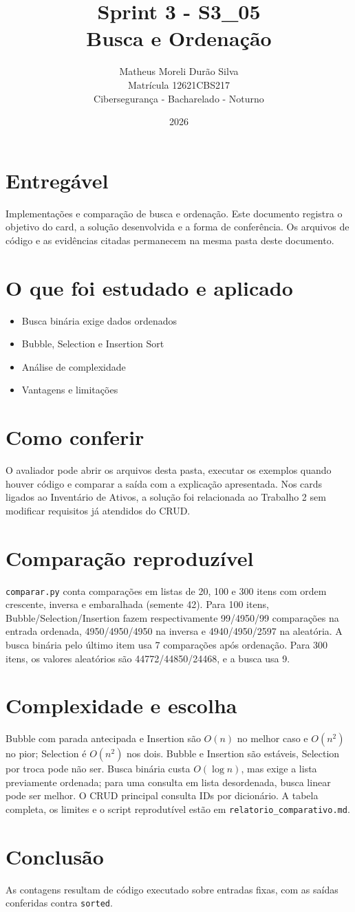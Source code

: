 \documentclass[12pt]{article}
\title{Sprint 3 - S3\_05\\Busca e Ordenação}
\author{Matheus Moreli Durão Silva\\Matrícula 12621CBS217\\Cibersegurança - Bacharelado - Noturno}
\date{2026}
\begin{document}
\maketitle

\section*{Entregável}
Implementações e comparação de busca e ordenação. Este documento registra o objetivo do card, a solução desenvolvida e a forma de conferência. Os arquivos de código e as evidências citadas permanecem na mesma pasta deste documento.

\section*{O que foi estudado e aplicado}
\begin{itemize}
\item Busca binária exige dados ordenados
\item Bubble, Selection e Insertion Sort
\item Análise de complexidade
\item Vantagens e limitações
\end{itemize}

\section*{Como conferir}
O avaliador pode abrir os arquivos desta pasta, executar os exemplos quando houver código e comparar a saída com a explicação apresentada. Nos cards ligados ao Inventário de Ativos, a solução foi relacionada ao Trabalho 2 sem modificar requisitos já atendidos do CRUD.

\section*{Comparação reproduzível}
\texttt{comparar.py} conta comparações em listas de 20, 100 e 300 itens com ordem crescente, inversa e embaralhada (semente 42). Para 100 itens, Bubble/Selection/Insertion fazem respectivamente 99/4950/99 comparações na entrada ordenada, 4950/4950/4950 na inversa e 4940/4950/2597 na aleatória. A busca binária pelo último item usa 7 comparações após ordenação. Para 300 itens, os valores aleatórios são 44772/44850/24468, e a busca usa 9.
\section*{Complexidade e escolha}
Bubble com parada antecipada e Insertion são $O(n)$ no melhor caso e $O(n^2)$ no pior; Selection é $O(n^2)$ nos dois. Bubble e Insertion são estáveis, Selection por troca pode não ser. Busca binária custa $O(\log n)$, mas exige a lista previamente ordenada; para uma consulta em lista desordenada, busca linear pode ser melhor. O CRUD principal consulta IDs por dicionário. A tabela completa, os limites e o script reprodutível estão em \texttt{relatorio\_comparativo.md}.
\section*{Conclusão}
As contagens resultam de código executado sobre entradas fixas, com as saídas conferidas contra \texttt{sorted}.
\end{document}
